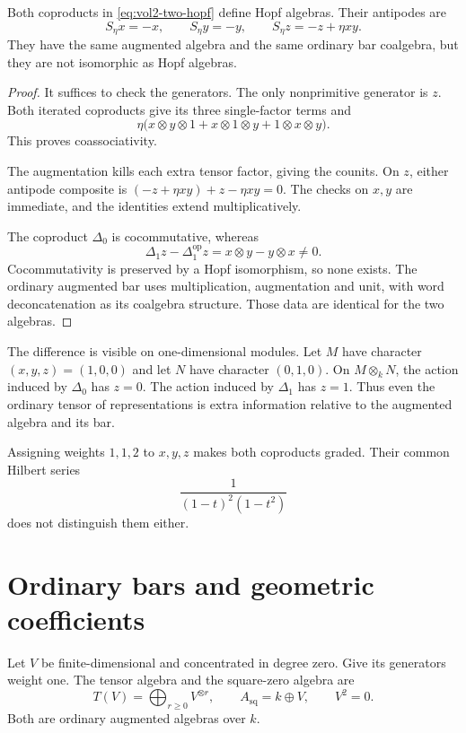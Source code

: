 \begin{proposition}\label{prop:vol2-two-hopf}
Both coproducts in \eqref{eq:vol2-two-hopf} define Hopf algebras.
Their antipodes are
\[
 S_\eta x=-x,\qquad S_\eta y=-y,\qquad
 S_\eta z=-z+\eta xy.
\]
They have the same augmented algebra and the same ordinary bar
coalgebra, but they are not isomorphic as Hopf algebras.
\end{proposition}
\begin{proof}
It suffices to check the generators.
The only nonprimitive generator is $z$.
Both iterated coproducts give its three single-factor terms and
\[
 \eta\bigl(x\otimes y\otimes1
       +x\otimes1\otimes y+1\otimes x\otimes y\bigr).
\]
This proves coassociativity.

The augmentation kills each extra tensor factor, giving the counits.
On $z$, either antipode composite is
$(-z+\eta xy)+z-\eta xy=0$.
The checks on $x,y$ are immediate, and the identities extend
multiplicatively.

The coproduct $\Delta_0$ is cocommutative, whereas
\[
 \Delta_1z-\Delta_1^{\mathrm{op}}z=x\otimes y-y\otimes x\ne0.
\]
Cocommutativity is preserved by a Hopf isomorphism, so none exists.
The ordinary augmented bar uses multiplication, augmentation and
unit, with word deconcatenation as its coalgebra structure.
Those data are identical for the two algebras.
\end{proof}

The difference is visible on one-dimensional modules.
Let $M$ have character $(x,y,z)=(1,0,0)$ and let $N$ have character
$(0,1,0)$.
On $M\otimes_k N$, the action induced by $\Delta_0$ has $z=0$.
The action induced by $\Delta_1$ has $z=1$.
Thus even the ordinary tensor of representations is extra information
relative to the augmented algebra and its bar.

Assigning weights $1,1,2$ to $x,y,z$ makes both coproducts graded.
Their common Hilbert series
\[
 \frac{1}{(1-t)^2(1-t^2)}
\]
does not distinguish them either.

\section{Ordinary bars and geometric coefficients}

Let $V$ be finite-dimensional and concentrated in degree zero.
Give its generators weight one.
The tensor algebra and the square-zero algebra are
\[
 T(V)=\bigoplus_{r\ge0}V^{\otimes r},
 \qquad
 A_{\mathrm{sq}}=k\oplus V,\qquad V^2=0.
\]
Both are ordinary augmented algebras over $k$.

